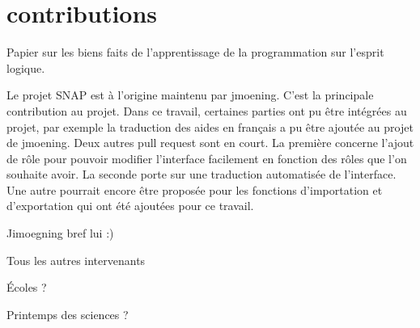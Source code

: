 \section{contributions}
\label{intro-contribution}
Papier sur les biens faits de l'apprentissage de la programmation sur l'esprit logique.

Le projet SNAP est à l'origine maintenu par jmoening. C'est la principale contribution au projet. Dans ce travail, certaines parties ont pu être intégrées au projet, par exemple la traduction des aides en français a pu être ajoutée au projet de jmoening. Deux autres pull request sont en court. La première concerne l'ajout de rôle pour pouvoir modifier l'interface facilement en fonction des rôles que l'on souhaite avoir. La seconde porte sur une traduction automatisée de l'interface. Une autre pourrait encore être proposée pour les fonctions d'importation et d'exportation qui ont été ajoutées pour ce travail.

Jimoegning bref lui :)

Tous les autres intervenants

Écoles ?

Printemps des sciences ?
